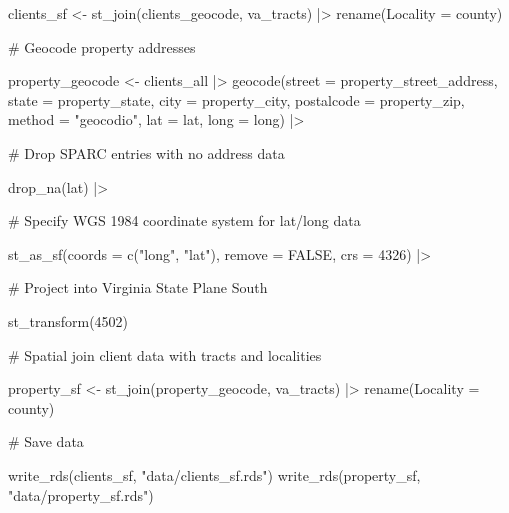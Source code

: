 \documentclass[
  letterpaper,
  DIV=11,
  numbers=noendperiod]{scrartcl}
\newenvironment{Shaded}{\begin{snugshade}}{\end{snugshade}}
\newcommand{\AttributeTok}[1]{\textcolor[rgb]{0.40,0.45,0.13}{#1}}
\newcommand{\CommentTok}[1]{\textcolor[rgb]{0.37,0.37,0.37}{#1}}
\newcommand{\ConstantTok}[1]{\textcolor[rgb]{0.56,0.35,0.01}{#1}}
\newcommand{\DecValTok}[1]{\textcolor[rgb]{0.68,0.00,0.00}{#1}}
\newcommand{\FunctionTok}[1]{\textcolor[rgb]{0.28,0.35,0.67}{#1}}
\newcommand{\NormalTok}[1]{\textcolor[rgb]{0.00,0.23,0.31}{#1}}
\newcommand{\OtherTok}[1]{\textcolor[rgb]{0.00,0.23,0.31}{#1}}
\newcommand{\SpecialCharTok}[1]{\textcolor[rgb]{0.37,0.37,0.37}{#1}}
\newcommand{\StringTok}[1]{\textcolor[rgb]{0.13,0.47,0.30}{#1}}
\begin{document}
\begin{Shaded}
\begin{Highlighting}[]
\NormalTok{clients\_sf }\OtherTok{\textless{}{-}} \FunctionTok{st\_join}\NormalTok{(clients\_geocode, va\_tracts) }\SpecialCharTok{|\textgreater{}} 
  \FunctionTok{rename}\NormalTok{(}\AttributeTok{Locality =}\NormalTok{ county)}
  
\CommentTok{\# Geocode property addresses}
  
\NormalTok{property\_geocode }\OtherTok{\textless{}{-}}\NormalTok{ clients\_all }\SpecialCharTok{|\textgreater{}}
  \FunctionTok{geocode}\NormalTok{(}\AttributeTok{street =}\NormalTok{ property\_street\_address, }\AttributeTok{state =}\NormalTok{ property\_state,}
          \AttributeTok{city =}\NormalTok{ property\_city, }\AttributeTok{postalcode =}\NormalTok{ property\_zip,}
          \AttributeTok{method =} \StringTok{"geocodio"}\NormalTok{,}
          \AttributeTok{lat =}\NormalTok{ lat,}
          \AttributeTok{long =}\NormalTok{ long) }\SpecialCharTok{|\textgreater{}} 
  
  \CommentTok{\# Drop SPARC entries with no address data}
  
  \FunctionTok{drop\_na}\NormalTok{(lat) }\SpecialCharTok{|\textgreater{}} 
  
  \CommentTok{\# Specify WGS 1984 coordinate system for lat/long data}
  
  \FunctionTok{st\_as\_sf}\NormalTok{(}\AttributeTok{coords =} \FunctionTok{c}\NormalTok{(}\StringTok{"long"}\NormalTok{, }\StringTok{"lat"}\NormalTok{),}
           \AttributeTok{remove =} \ConstantTok{FALSE}\NormalTok{,}
           \AttributeTok{crs =} \DecValTok{4326}\NormalTok{) }\SpecialCharTok{|\textgreater{}} 
  
  \CommentTok{\# Project into Virginia State Plane South}
  
  \FunctionTok{st\_transform}\NormalTok{(}\DecValTok{4502}\NormalTok{)}

\CommentTok{\# Spatial join client data with tracts and localities}
  
\NormalTok{property\_sf }\OtherTok{\textless{}{-}} \FunctionTok{st\_join}\NormalTok{(property\_geocode, va\_tracts) }\SpecialCharTok{|\textgreater{}} 
  \FunctionTok{rename}\NormalTok{(}\AttributeTok{Locality =}\NormalTok{ county)}

\CommentTok{\# Save data}

\FunctionTok{write\_rds}\NormalTok{(clients\_sf, }\StringTok{"data/clients\_sf.rds"}\NormalTok{)}
\FunctionTok{write\_rds}\NormalTok{(property\_sf, }\StringTok{"data/property\_sf.rds"}\NormalTok{)}
\end{Highlighting}
\end{Shaded}
\end{document}

